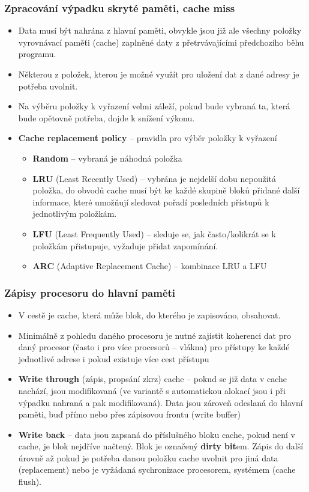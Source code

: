 \documentclass{beamer}
\begin{document}
\begin{frame}
\frametitle{Zpracování výpadku skryté paměti, cache miss}

\begin{itemize}
\item Data musí být nahrána z hlavní paměti, obvykle jsou již ale všechny položky vyrovnávací paměťi (cache) zaplněné daty z přetrvávajícími předchozího běhu programu.
\item Některou z položek, kterou je možné využít pro uložení dat z dané adresy je potřeba uvolnit.
\item Na výběru položky k vyřazení velmi záleží, pokud bude vybraná ta, která bude opětovně potřeba, dojde k snížení výkonu.
\item \textbf{Cache replacement policy} -- pravidla pro výběr položky k vyřazení
\begin{itemize}
\item \textbf{Random} -- vybraná je náhodná položka
\item \textbf{LRU} (Least Recently Used) -- vybrána je nejdelší dobu nepoužitá položka, do obvodů cache musí být ke každé skupině bloků přidané další informace, které umožňují sledovat pořadí posledních přístupů k jednotlivým položkám.
\item \textbf{LFU} (Least Frequently Used) -- sleduje se, jak často/kolikrát se k položkám přistupuje, vyžaduje přidat zapomínání.
\item \textbf{ARC} (Adaptive Replacement Cache) – kombinace LRU a LFU
\end{itemize}
\end{itemize}

\end{frame}

\begin{frame}
\frametitle{Zápisy procesoru do hlavní paměti}

\begin{itemize}
\item V cestě je cache, která může blok, do kterého je zapisováno, obsahovat.
\item Minimálně z pohledu daného procesoru je nutné zajistit koherenci dat pro daný procesor (často i pro více procesorů -- vlákna) pro přístupy ke každé jednotlivé adrese i pokud existuje více cest přístupu 
\item \textbf{Write through} (zápis, propsání zkrz) cache -- pokud se již data v cache nachází, jsou modifikovaná (ve variantě s automatickou alokací jsou i při výpadku nahraná a pak modifikovaná). Data jsou zároveň odeslaná do hlavní paměti, buď přímo nebo přes zápisovou frontu (write buffer)
\item \textbf{Write back} -- data jsou zapsaná do příslušného bloku cache, pokud není v cache, je blok nejdříve načtený. Blok je označený \textbf{dirty bit}em. Zápis do další úrovně až pokud je potřeba danou položku cache uvolnit pro jiná data (replacement) nebo je vyžádaná sychronizace procesorem, systémem (cache flush).
\end{itemize}

\end{frame}
\end{document}
